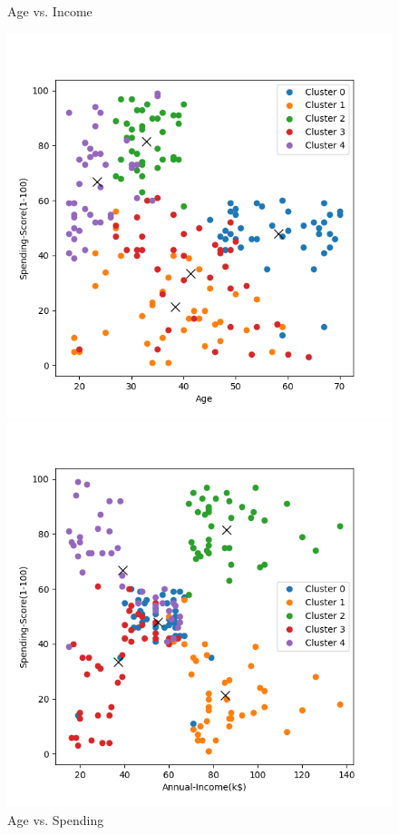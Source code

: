 \documentclass[8pt]{article}
\begin{document}
\begin{figure}[H]
\begin{minipage}{0.32\textwidth}
        \caption{Age vs. Income}
        \label{fig: Age vs. Annual Income k5 mcom2 con min20}
    \end{minipage}
    \hfill
    \begin{minipage}{0.32\textwidth}
        \centering
        \includegraphics[width=\textwidth]{./Prob4/out/task3_2_mcom2/images/cluster_result_k5_0_2.png}
        \caption{Age vs. Spending}
        \label{fig: Age vs. Spending Score k5 mcom2 con min20}
    \end{minipage}
    \hfill
    \begin{minipage}{0.32\textwidth}
        \centering
        \includegraphics[width=\textwidth]{./Prob4/out/task3_2_mcom2/images/cluster_result_k5_1_2.png}

\end{minipage}
\end{figure}
\end{document}
